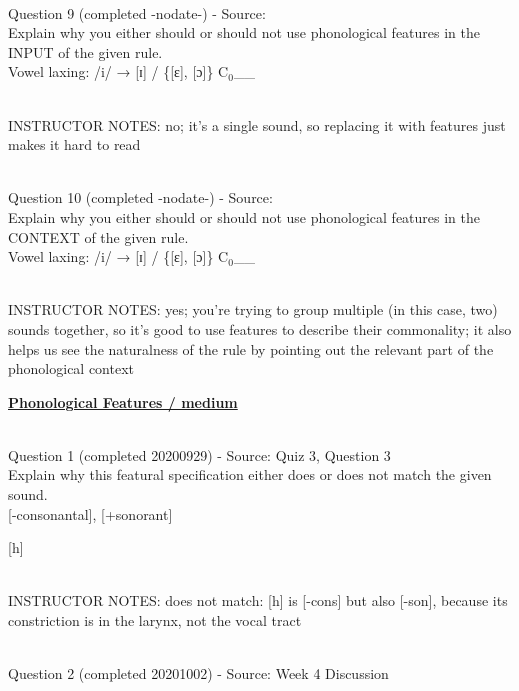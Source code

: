 \documentclass[12pt]{article}
\begin{document}
~\\

{\large Question 9} (completed -nodate-) - Source: \\

Explain why you either should or should not use phonological features in the INPUT of the given rule.\\

Vowel laxing: /i/ → {[ɪ]} / \{{[ɛ]}, {[ɔ]}\} C$_0$\_\_


~\\
INSTRUCTOR NOTES: no; it's a single sound, so replacing it with features just makes it hard to read


~\\

{\large Question 10} (completed -nodate-) - Source: \\

Explain why you either should or should not use phonological features in the CONTEXT of the given rule.\\

Vowel laxing: /i/ → {[ɪ]} / \{{[ɛ]}, {[ɔ]}\} C$_0$\_\_


~\\
INSTRUCTOR NOTES: yes; you're trying to group multiple (in this case, two) sounds together, so it's good to use features to describe their commonality; it also helps us see the naturalness of the rule by pointing out the relevant part of the phonological context


\newpage\textbf{\underline{\huge Phonological Features / medium\\}}

~\\

{\large Question 1} (completed 20200929) - Source: Quiz 3, Question 3\\

Explain why this featural specification either does or does not match the given sound.\\

{[-consonantal]}, {[+sonorant]}

{[h]}


~\\
INSTRUCTOR NOTES: does not match: [h] is [-cons] but also [-son], because its constriction is in the larynx, not the vocal tract


~\\

{\large Question 2} (completed 20201002) - Source: Week 4 Discussion\\
\end{document}
